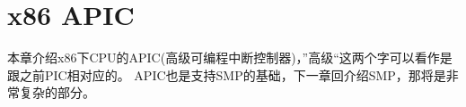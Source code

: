 \chapter{x86 APIC}
本章介绍x86下CPU的APIC(高级可编程中断控制器)，”高级“这两个字可以看作是跟之前PIC相对应的。
APIC也是支持SMP的基础，下一章回介绍SMP，那将是非常复杂的部分。
